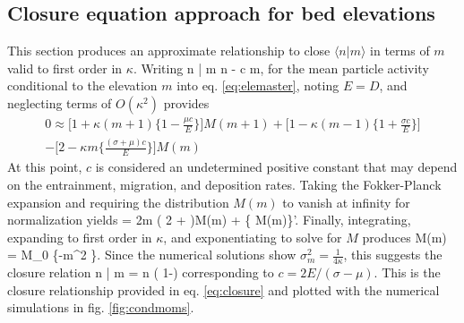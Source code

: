 \subsection{Closure equation approach for bed elevations}
This section produces an approximate relationship to close
$\langle n | m \rangle$ in terms of $m$ valid to first order in $\kappa$. Writing 
\be \langle n | m \rangle \approx \langle n \rangle  - \kappa c m,\ee
for the mean particle activity conditional to the elevation $m$ into eq. \ref{eq:elemaster}, noting $E=D$, and neglecting terms of $O(\kappa^2)$ provides 
\begin{multline} 0 \approx \Big[ 1+\kappa(m+1)\Big\{ 1-\frac{\mu c}{E}\Big\}\Big]M(m+1) + \Big[1-\kappa(m-1)\Big\{1+\frac{\sigma c}{E}\Big\}\Big]\\-\Big[2-\kappa m\Big\{\frac{(\sigma+\mu)c}{E}\Big\}\Big]M(m)
\end{multline}
At this point, $c$ is considered an undetermined positive constant that may depend on the entrainment, migration, and deposition rates.
Taking the Fokker-Planck expansion and requiring the distribution $M(m)$ to vanish at infinity for normalization yields
 = 2\kappa m \Big( 2 + \Big)M(m) + \Big\{
M(m)\Big\}'.\ee
Finally, integrating, expanding to first order in $\kappa$, and exponentiating to solve for $M$ produces
\be M(m) = M_0 \exp\Big\{-\kappa m^2 \Big\}.\ee
Since the numerical solutions show $\sigma_m^2 = \frac{1}{4\kappa}$, this suggests the closure relation
\be \langle n | m \rangle = \langle n \rangle\Big( 1-\Big) \ee
corresponding to $c=2E/(\sigma-\mu)$. This is the closure relationship provided in eq. \ref{eq:closure} and plotted with the numerical simulations in fig. \ref{fig:condmoms}.
